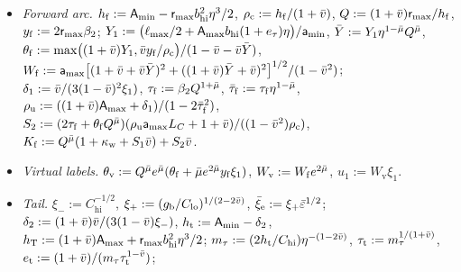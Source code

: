 \begin{TDdefinition}[Constants]
{\begin{itemize}
$\angle_{\mathrm w}:=\arcsin m_0+\omega_{\mathrm w}+\omega_{\mathrm p}$, $\STA_{\min}:=\cos\angle_{\mathrm w}$,
$\STA_{\max}:=W_{\mathrm w}$; $b_{\mathrm{lo}}:=\Lambda_{\min}(1-\eta^2/48)/4$, $b_{\mathrm{hi}}:=\Lambda_{\max}/4$,
$\bar b:=b_{\mathrm{hi}}\eta^2$, $e_\tau:=\tan(\bar b/2)/(\bar b/2)-1$, $\beta_2:=b_{\mathrm{hi}}(1+e_\tau)/2$;
$C_{\mathrm{hi}}:=2\TDr_{\max}\beta_2^{1-\HTvb}$, $C_{\mathrm{lo}}:=2\TDr_{\min}(b_{\mathrm{lo}}/2)/(1+\tan^2(\bar b/2))$;
$\mathrm{aux}:=\ell_{\max}\bar b\eta/2$, $\TDa_{\min}:=\STA_{\min}\cos\bar b-\mathrm{aux}$,
$\TDa_{\max}:=\STA_{\max}(1+\HTvb)+\mathrm{aux}$; $L_C:=2\Lambda_{\max}/\Lambda_{\min}+\eta\STA_{\max}/\TDr_{\min}$,
$L_{\mathrm{lo}}:=2(\cos\bar b-\HTvb)(\Lambda_{\min}/\Lambda_{\max})(1-\eta^2/32)$;
$S_1:=\ell_{\max}\bigl(\TDr_{\max}\TDa_{\max}L_C+(1+\HTvb)\eta\bigr)/\bigl(2(1-\HTvb^2)\TDr_{\min}\bigr)$.
\item \emph{Forward arc.} $h_{\mathrm f}:=\mathsf A_{\min}-\mathsf r_{\max}b_{\mathrm{hi}}^2\eta^3/2$, $\rho_{\mathrm c}:=h_{\mathrm f}/(1+\bar v)$,
$Q:=(1+\bar v)\mathsf r_{\max}/h_{\mathrm f}$, $y_{\mathrm f}:=2\mathsf r_{\max}\beta_2$;
$Y_1:=\bigl(\ell_{\max}/2+\mathsf A_{\max}b_{\mathrm{hi}}(1+e_\tau)\eta\bigr)/\mathsf a_{\min}$, $\bar Y:=Y_1\eta^{1-\bar\mu}Q^{\bar\mu}$,
$\theta_{\mathrm f}:=\max\bigl((1+\bar v)Y_1,\bar v y_{\mathrm f}/\rho_{\mathrm c}\bigr)/(1-\bar v-\bar v\bar Y)$,
$W_{\mathrm f}:=\mathsf a_{\max}\bigl[(1+\bar v+\bar v\bar Y)^2+((1+\bar v)\bar Y+\bar v)^2\bigr]^{1/2}/(1-\bar v^2)$;
$\delta_1:=\bar v/(3(1-\bar v)^2\xi_1)$, $\tau_{\mathrm f}:=\beta_2Q^{1+\bar\mu}$, $\bar\tau_{\mathrm f}:=\tau_{\mathrm f}\eta^{1-\bar\mu}$,
$\rho_{\mathrm u}:=((1+\bar v)\mathsf A_{\max}+\delta_1)/(1-2\bar\tau_{\mathrm f}^2)$,
$S_2:=(2\tau_{\mathrm f}+\theta_{\mathrm f}Q^{\bar\mu})(\rho_{\mathrm u}\mathsf a_{\max}L_C+1+\bar v)/((1-\bar v^2)\rho_{\mathrm c})$,
$K_{\mathrm f}:=Q^{\bar\mu}(1+\kappa_{\mathrm w}+S_1\bar v)+S_2\bar v$.
\item \emph{Virtual labels.} $\theta_{\mathrm v}:=Q^{\bar\mu}e^{\bar\mu}(\theta_{\mathrm f}+\bar\mu e^{2\bar\mu}y_{\mathrm f}\xi_1)$,
$W_{\mathrm v}:=W_{\mathrm f}e^{2\bar\mu}$, $u_1:=W_{\mathrm v}\xi_1$.
\item \emph{Tail.} $\xi_-:=C_{\mathrm{hi}}^{-1/2}$, $\xi_+:=(g_{\mathrm b}/C_{\mathrm{lo}})^{1/(2-2\bar v)}$, $\bar\xi_{\mathrm e}:=\xi_+\bar\varepsilon^{1/2}$;
$\delta_2:=(1+\bar v)\bar v/(3(1-\bar v)\xi_-)$, $h_{\mathrm t}:=\mathsf A_{\min}-\delta_2$,
$h_{\mathrm T}:=(1+\bar v)\mathsf A_{\max}+\mathsf r_{\max}b_{\mathrm{hi}}^2\eta^3/2$; $m_\tau:=(2h_{\mathrm t}/C_{\mathrm{hi}})\eta^{-(1-2\bar v)}$,
$\tau_{\mathrm t}:=m_\tau^{1/(1+\bar v)}$, $e_{\mathrm t}:=(1+\bar v)/(m_\tau\tau_{\mathrm t}^{1-\bar v})$;

\end{itemize}}
\end{TDdefinition}
